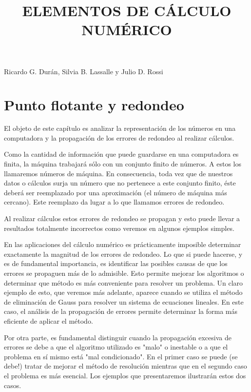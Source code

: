 \documentclass[10pt]{book}
\title{ELEMENTOS DE CÁLCULO NUMÉRICO }
\author{}
\date{}
\begin{document}
\maketitle
\captionsetup{singlelinecheck=false}
Ricardo G. Durán, Silvia B. Lassalle y Julio D. Rossi

\tableofcontents
\cleardoublepage


\chapter{Punto flotante y redondeo}
El objeto de este capítulo es analizar la representación de los números en una computadora y la propagación de los errores de redondeo al realizar cálculos.

Como la cantidad de información que puede guardarse en una computadora es finita, la máquina trabajará sólo con un conjunto finito de números. A estos los llamaremos números de máquina. En consecuencia, toda vez que de nuestros datos o cálculos surja un número que no pertenece a este conjunto finito, éste deberá ser reemplazado por una aproximación (el número de máquina más cercano). Este reemplazo da lugar a lo que llamamos errores de redondeo.

Al realizar cálculos estos errores de redondeo se propagan y esto puede llevar a resultados totalmente incorrectos como veremos en algunos ejemplos simples.

En las aplicaciones del cálculo numérico es prácticamente imposible determinar exactamente la magnitud de los errores de redondeo. Lo que si puede hacerse, y es de fundamental importancia, es identificar las posibles causas de que los errores se propaguen más de lo admisible. Esto permite mejorar los algoritmos o determinar que método es más conveniente para resolver un problema. Un claro ejemplo de esto, que veremos más adelante, aparece cuando se utiliza el método de eliminación de Gauss para resolver un sistema de ecuaciones lineales. En este caso, el análisis de la propagación de errores permite determinar la forma más eficiente de aplicar el método.

Por otra parte, es fundamental distinguir cuando la propagación excesiva de errores se debe a que el algoritmo utilizado es "malo" o inestable o a que el problema en sí mismo está "mal condicionado". En el primer caso se puede (se debe!) tratar de mejorar el método de resolución mientras que en el segundo caso el problema es más esencial. Los ejemplos que presentaremos ilustrarán estos dos casos.
\end{document}

